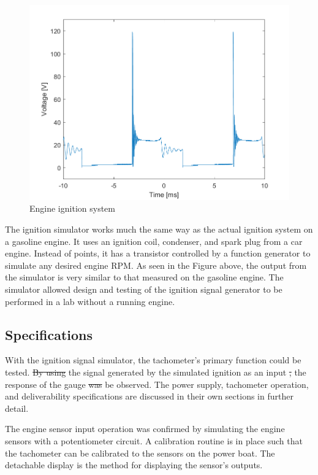 \documentclass[11pt]{article}
\providecommand{\DIFaddtex}[1]{{\protect\color{blue}\uwave{#1}}} %
\providecommand{\DIFdeltex}[1]{{\protect\color{red}\sout{#1}}}                      %
\providecommand{\DIFaddbegin}{} %
\providecommand{\DIFaddend}{} %
\providecommand{\DIFdelbegin}{} %
\providecommand{\DIFdelend}{} %
\providecommand{\DIFadd}[1]{\texorpdfstring{\DIFaddtex{#1}}{#1}} %
\providecommand{\DIFdel}[1]{\texorpdfstring{\DIFdeltex{#1}}{}} %
\newcommand{\DIFscaledelfig}{0.5}
\newlength{\DIFdelgraphicswidth} %
\newlength{\DIFdelgraphicsheight} %
\newcommand{\DIFaddincludegraphics}[2][]{{\color{blue}\fbox{\DIFOincludegraphics[#1]{#2}}}} %
\newcommand{\DIFdelincludegraphics}[2][]{%
\sbox{\DIFdelgraphicsbox}{\DIFOincludegraphics[#1]{#2}}%
\settoboxwidth{\DIFdelgraphicswidth}{\DIFdelgraphicsbox} %
\settoboxtotalheight{\DIFdelgraphicsheight}{\DIFdelgraphicsbox} %
\scalebox{\DIFscaledelfig}{%
\parbox[b]{\DIFdelgraphicswidth}{\usebox{\DIFdelgraphicsbox}\\[-\baselineskip] \rule{\DIFdelgraphicswidth}{0em}}\llap{\resizebox{\DIFdelgraphicswidth}{\DIFdelgraphicsheight}{%
\setlength{\unitlength}{\DIFdelgraphicswidth}%
\begin{picture}(1,1)%
\thicklines\linethickness{2pt} %
{\color[rgb]{1,0,0}\put(0,0){\framebox(1,1){}}}%
{\color[rgb]{1,0,0}\put(0,0){\line( 1,1){1}}}%
{\color[rgb]{1,0,0}\put(0,1){\line(1,-1){1}}}%
\end{picture}%
}\hspace*{3pt}}} %
} %
\DeclareRobustCommand{\DIFaddbegin}{\DIFOaddbegin \let\includegraphics\DIFaddincludegraphics} %
\DeclareRobustCommand{\DIFaddend}{\DIFOaddend \let\includegraphics\DIFOincludegraphics} %
\DeclareRobustCommand{\DIFdelbegin}{\DIFOdelbegin \let\includegraphics\DIFdelincludegraphics} %
\DeclareRobustCommand{\DIFdelend}{\DIFOaddend \let\includegraphics\DIFOincludegraphics} %
\begin{document}
\begin{figure}[H]
    \centering
    \includegraphics[width=\textwidth]{sim_raw}
    \caption{Engine ignition system}
    \label{fig:sim_raw}
\end{figure}

The ignition simulator works much the same way as the actual ignition system on a gasoline engine. It uses an ignition coil, condenser, and spark plug from a car engine. Instead of points, it has a transistor controlled by a function generator to simulate any desired engine RPM. As seen in the Figure above, the output from the simulator is very similar to that measured on the gasoline engine. The simulator allowed design and testing of the ignition signal generator to be performed in a lab without a running engine.


\subsection{Specifications}
With the ignition signal simulator, the tachometer's primary function could be tested. \DIFdelbegin \DIFdel{By using }\DIFdelend \DIFaddbegin \DIFadd{Using }\DIFaddend the signal generated by the simulated ignition as an input \DIFdelbegin \DIFdel{, }\DIFdelend \DIFaddbegin \DIFadd{allowed }\DIFaddend the response of the gauge \DIFdelbegin \DIFdel{was }\DIFdelend \DIFaddbegin \DIFadd{to }\DIFaddend be observed. The power supply, tachometer operation, and deliverability specifications are discussed in their own sections in further detail.

The engine sensor input operation was confirmed by simulating the engine sensors with a potentiometer circuit. A calibration routine is in place such that the tachometer can be calibrated to the sensors on the power boat. The detachable display is the method for displaying the sensor's outputs.
\end{document}
